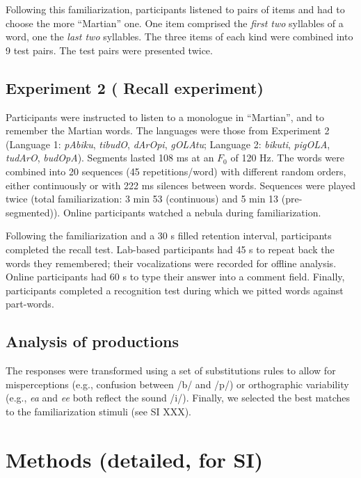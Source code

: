 \documentclass[
]{article}
\begin{document}
Following this familiarization, participants listened to pairs of items
and had to choose the more ``Martian'' one. One item comprised the
\emph{first two} syllables of a word, one the \emph{last two} syllables.
The three items of each kind were combined into 9 test pairs. The test
pairs were presented twice.

\subsection{Experiment 2 ( Recall
experiment)}\label{experiment-2-recall-experiment}

Participants were instructed to listen to a monologue in ``Martian'',
and to remember the Martian words. The languages were those from
\citet{Saffran-Science} Experiment 2 (Language 1: \emph{pAbiku},
\emph{tibudO}, \emph{dArOpi}, \emph{gOLAtu}; Language 2: \emph{bikuti},
\emph{pigOLA}, \emph{tudArO}, \emph{budOpA}). Segments lasted 108 ms at
an \(F_0\) of 120 Hz. The words were combined into 20 sequences (45
repetitions/word) with different random orders, either continuously or
with 222 ms silences between words. Sequences were played twice (total
familiarization: 3 min 53 (continuous) and 5 min 13 (pre-segmented)).
Online participants watched a nebula during familiarization.

Following the familiarization and a 30 s filled retention interval,
participants completed the recall test. Lab-based participants had 45 s
to repeat back the words they remembered; their vocalizations were
recorded for offline analysis. Online participants had 60 s to type
their answer into a comment field. Finally, participants completed a
recognition test during which we pitted words against part-words.

\subsection{Analysis of productions}\label{analysis-of-productions}

The responses were transformed using a set of substitutions rules to
allow for misperceptions (e.g., confusion between /b/ and /p/) or
orthographic variability (e.g., \emph{ea} and \emph{ee} both reflect the
sound /i/). Finally, we selected the best matches to the familiarization
stimuli (see SI XXX).

\section{Methods (detailed, for SI)}\label{methods-detailed-for-si}
\end{document}
